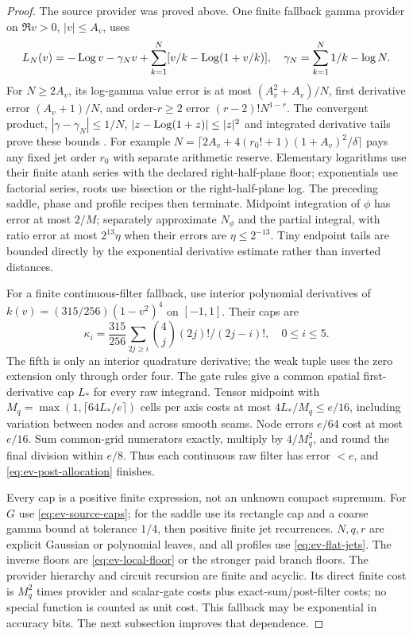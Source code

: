 \begin{proof}
The source provider was proved above. One finite fallback gamma
provider on $\Re v>0$, $|v|\le A_v$, uses
\[
 L_N(v)=-\operatorname{Log} v-\gamma_Nv+
       \sum_{k=1}^N[v/k-\operatorname{Log}(1+v/k)],\quad
 \gamma_N=\sum_{k=1}^N1/k-\log N.
\]
For $N\ge2A_v$, its log-gamma value error is at most
$(A_v^2+A_v)/N$, first derivative error $(A_v+1)/N$, and
order-$r\ge2$ error $(r-2)!N^{1-r}$. The convergent product,
$|\gamma-\gamma_N|\le1/N$, $|z-\operatorname{Log}(1+z)|\le|z|^2$ and
integrated derivative tails prove these bounds \cite{DLMFEulerGamma}.
For example $N=\lceil2A_v+4(r_0!+1)(1+A_v)^2/\delta\rceil$
pays any fixed jet order $r_0$ with separate arithmetic reserve.
Elementary logarithms use their finite atanh series with the declared
right-half-plane floor; exponentials use factorial series, roots use
bisection or the right-half-plane log. The preceding saddle, phase
and profile recipes then terminate. Midpoint integration of $\phi$
has error at most $2/M$; separately approximate $N_\phi$ and the
partial integral, with ratio error at most $2^{13}\eta$ when their
errors are $\eta\le2^{-13}$. Tiny endpoint tails are bounded directly
by the exponential derivative estimate rather than inverted distances.

For a finite continuous-filter fallback, use interior polynomial
derivatives of $k(v)=(315/256)(1-v^2)^4$ on $[-1,1]$. Their caps
are
\[
 \kappa_i=\frac{315}{256}\sum_{2j\ge i}
               \binom4j(2j)!/(2j-i)!,\quad0\le i\le5.
\]
The fifth is only an interior quadrature derivative; the weak tuple
uses the zero extension only through order four. The gate rules give
a common spatial first-derivative cap $L_*$ for every raw integrand.
Tensor midpoint with $M_q=\max(1,\lceil64L_*/e\rceil)$ cells per
axis costs at most $4L_*/M_q\le e/16$, including variation between
nodes and across smooth seams. Node errors $e/64$ cost at most
$e/16$. Sum common-grid numerators exactly, multiply by $4/M_q^2$,
and round the final division within $e/8$. Thus each continuous raw
filter has error $<e$, and \eqref{eq:ev-post-allocation} finishes.

Every cap is a positive finite expression, not an unknown compact
supremum. For $G$ use \eqref{eq:ev-source-caps}; for the saddle use
its rectangle cap and a coarse gamma bound at tolerance $1/4$, then
positive finite jet recurrences. $N,q,r$ are explicit Gaussian or
polynomial leaves, and all profiles use \eqref{eq:ev-flat-jets}.
The inverse floors are \eqref{eq:ev-local-floor} or the stronger
paid branch floors. The provider hierarchy and circuit recursion are
finite and acyclic. Its direct finite cost is $M_q^2$ times provider
and scalar-gate costs plus exact-sum/post-filter costs; no special
function is counted as unit cost. This fallback may be exponential
in accuracy bits. The next subsection improves that dependence.


\end{proof}
